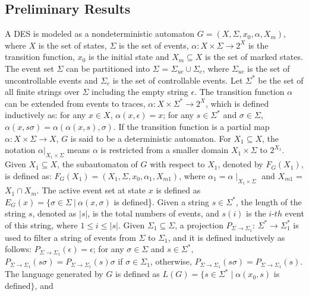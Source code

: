 \documentclass[preprint,authoryear,12pt]{elsarticle}
\begin{document}
\subsection{Preliminary Results}
A DES is modeled as a nondeterministic automaton $G
=(X,\Sigma,x_{0},\alpha, X_{m})$, where $X$ is the set of states,
$\Sigma$ is the set of events, $\alpha : \!X \times \Sigma \!
\rightarrow 2^X$ is the transition function, $x_0$ is the initial
state and $X_m \subseteq X$ is the set of marked states. The event
set $\Sigma$ can be partitioned into $\Sigma$ = $\Sigma_{uc} \cup
\Sigma_{c}$, where $\Sigma_{uc}$ is the set of uncontrollable
events and $\Sigma_{c}$ is the set of controllable events. Let
$\Sigma^{*}$ be the set of all finite strings over $\Sigma$
including the empty string $\epsilon$. The transition function
$\alpha$ can be extended from events to traces, $\alpha : \!X
\times \Sigma^{*} \!\rightarrow 2^{X}$, which is defined
inductively as: for any $x \in X$, $\alpha(x, \epsilon)=x$; for
any $s\in \Sigma^{*}$ and $\sigma \in \Sigma$, $\alpha(x,
s\sigma)=\alpha(\alpha(x, s), \sigma)$. If the transition function
is a partial map $\alpha: \!X \times \Sigma \!\rightarrow X$, $G$
is said to be a deterministic automaton. For $X_1 \subseteq X$,
the notation $\alpha|_{X_1 \! \times \! \Sigma}$ means $\alpha$ is
restricted from a smaller domain $X_1 \! \times \!\Sigma$ to
$2^{X_1}$. Given $X_1 \subseteq X$, the subautomaton of $G$ with
respect to $X_1$, denoted by $F_{G}(X_1)$, is defined as: $
F_{G}(X_1)= (X_1,\Sigma,x_{0},\alpha_1,X_{m1})$, where $\alpha_1
\! = \!\alpha \!\mid_{X_1 \!\times \! \Sigma}$ and $X_{m1}$ = $X_1
\! \cap X_{m}$. The active event set at state $x$ is defined as
$E_{G}(x)=\{\sigma \in \Sigma~|~\alpha(x, \sigma)$ is defined\}.
Given a string $s \in \Sigma^{*}$, the length of the string $s$,
denoted as $|s|$, is the total numbers of events, and $s(i)$ is
the $i$-$th$ event of this string, where $1 \leq i \leq |s|$.
Given $\Sigma_1 \subseteq \Sigma$, a projection
$P_{\Sigma\!\rightarrow \Sigma_1}$: $\Sigma^{*}\! \rightarrow
\Sigma_{1}^{*}$ is used to filter a string of events from $\Sigma$
to $\Sigma_1$, and it is defined inductively as follows:
$P_{\Sigma\!\rightarrow \Sigma_1}(\epsilon)=\epsilon$; for any
$\sigma \in \Sigma$ and $s \in \Sigma^{*}$,
$P_{\Sigma\!\rightarrow \Sigma_1}(s\sigma)=P_{\Sigma\!\rightarrow
\Sigma_1}(s)\sigma$ if $\sigma \in \Sigma_1$, otherwise,
$P_{\Sigma\!\rightarrow \Sigma_1}(s\sigma)=P_{\Sigma\!\rightarrow
\Sigma_1}(s)$. The language generated by $G$ is defined as
$L(G)=\{s \in \Sigma^{*} \mid \alpha(x_0, s)$ is defined$\}$, and
\end{document}
